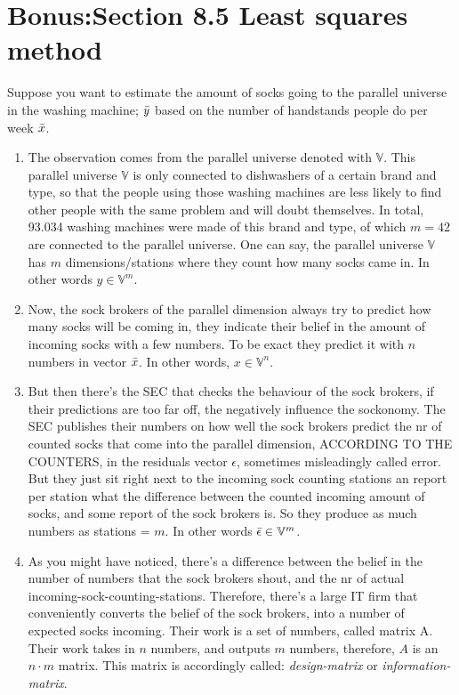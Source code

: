 \newpage
\section{Bonus:Section 8.5 Least squares method}
Suppose you want to estimate the amount of socks going to the parallel universe in the washing machine; $\Bar{y}$ based on the number of handstands people do per week $\Bar{x}$. 
\begin{enumerate}
    \item The observation comes from the parallel universe denoted with $\mathbb{V}$. This parallel universe $\mathbb{V}$ is only connected to dishwashers of a certain brand and type, so that the people using those washing machines are less likely to find other people with the same problem and will doubt themselves. In total, 93.034 washing machines were made of this brand and type, of which $m=42$ are connected to the parallel universe. One can say, the parallel universe $\mathbb{V}$ has $m$ dimensions/stations where they count how many socks came in. In other words $y \in \mathbb{V}^m$.
    \item Now, the sock brokers of the parallel dimension always try to predict how many socks will be coming in, they indicate their belief in the amount of incoming socks with a few numbers. To be exact they predict it with $n$ numbers  in vector $\Bar{x}$. In other words, $x \in \mathbb{V}^n$.
    \item But then there's the SEC that checks the behaviour of the sock brokers, if their predictions are too far off, the negatively influence the sockonomy. The SEC publishes their numbers on how well the sock brokers predict the nr of counted socks that come into the parallel dimension, ACCORDING TO THE COUNTERS, in the residuals vector $\epsilon$, sometimes misleadingly called error. But they just sit right next to the incoming sock counting stations an report per station what the difference between the counted incoming amount of socks, and some report of the sock brokers is. So they produce as much numbers as stations = $m$. In other words $\Bar{\epsilon}\in\mathbb{V}^m$. 
    \item As you might have noticed, there's a difference between the belief in the number of numbers that the sock brokers shout, and the nr of actual incoming-sock-counting-stations. Therefore, there's a large IT firm that conveniently converts the belief of the sock brokers, into a number of expected socks incoming. Their work is a set of numbers, called matrix A. Their work takes in $n$ numbers, and outputs $m$ numbers, therefore, $A$ is an $n\cdot m$ matrix. This matrix is accordingly called: \textit{design-matrix} or \textit{information-matrix}.

\end{enumerate}
